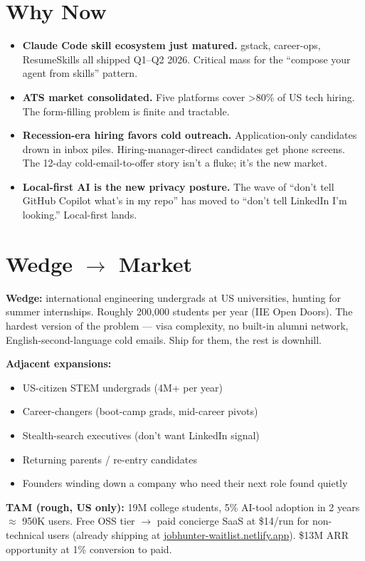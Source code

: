 \documentclass[11pt]{article}
\begin{document}
\section{Why Now}

\begin{itemize}
  \item \textbf{Claude Code skill ecosystem just matured.} gstack, career-ops, ResumeSkills all shipped Q1--Q2 2026. Critical mass for the ``compose your agent from skills'' pattern.
  \item \textbf{ATS market consolidated.} Five platforms cover \textgreater 80\% of US tech hiring. The form-filling problem is finite and tractable.
  \item \textbf{Recession-era hiring favors cold outreach.} Application-only candidates drown in inbox piles. Hiring-manager-direct candidates get phone screens. The 12-day cold-email-to-offer story isn't a fluke; it's the new market.
  \item \textbf{Local-first AI is the new privacy posture.} The wave of ``don't tell GitHub Copilot what's in my repo'' has moved to ``don't tell LinkedIn I'm looking.'' Local-first lands.
\end{itemize}

\section{Wedge \(\to\) Market}

\textbf{Wedge:} international engineering undergrads at US universities, hunting for summer internships. Roughly 200,000 students per year (IIE Open Doors). The hardest version of the problem --- visa complexity, no built-in alumni network, English-second-language cold emails. Ship for them, the rest is downhill.

\textbf{Adjacent expansions:}

\begin{itemize}
  \item US-citizen STEM undergrads (4M+ per year)
  \item Career-changers (boot-camp grads, mid-career pivots)
  \item Stealth-search executives (don't want LinkedIn signal)
  \item Returning parents / re-entry candidates
  \item Founders winding down a company who need their next role found quietly
\end{itemize}

\textbf{TAM (rough, US only):} 19M college students, 5\% AI-tool adoption in 2 years $\approx$ 950K users. Free OSS tier $\to$ paid concierge SaaS at \$14/run for non-technical users (already shipping at \href{https://jobhunter-waitlist.netlify.app}{jobhunter-waitlist.netlify.app}). \$13M ARR opportunity at 1\% conversion to paid.
\end{document}

